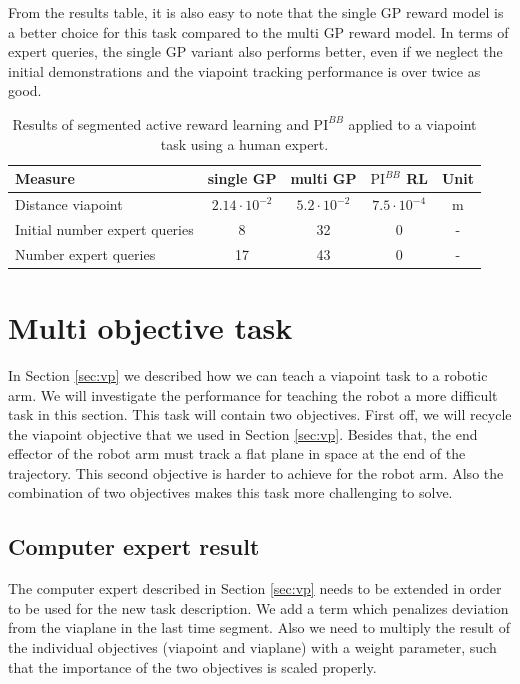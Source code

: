 \documentclass[mscThesis.tex]{subfiles}
\begin{document}
From the results table, it is also easy to note that the single GP reward model is a better choice for this task compared to the multi GP reward model. In terms of expert queries, the single GP variant also performs better, even if we neglect the initial demonstrations and the viapoint tracking performance is over twice as good.

\begin{table}[!htb]
    \centering
    \caption{Results of segmented active reward learning and $\text{PI}^{BB}$ applied to a viapoint task using a human expert.}
    \label{tab:vp-com-man}
    \begin{tabular}{|p{6cm}|c|c|c|c|}
        \hline
        Measure & single GP & multi GP & $\text{PI}^{BB}$ RL & Unit \\ \hline \hline
        Distance viapoint & $2.14 \cdot 10^{-2}$ & $5.2 \cdot 10^{-2}$ & $7.5 \cdot 10^{-4}$ & \si{m}  \\ \hline
        Initial number expert queries & 8 & 32 & 0 & - \\ \hline
        Number expert queries & 17 & 43 & 0 &  - \\ \hline
    \end{tabular}
\end{table}


\section{Multi objective task}
\label{sec:ad}

In Section \ref{sec:vp} we described how we can teach a viapoint task to a robotic arm. We will investigate the performance for teaching the robot a more difficult task in this section. This task will contain two objectives. First off, we will recycle the viapoint objective that we used in Section \ref{sec:vp}. Besides that, the end effector of the robot arm must track a flat plane in space at the end of the trajectory. This second objective is harder to achieve for the robot arm. Also the combination of two objectives makes this task more challenging to solve.

\subsection{Computer expert result}
\label{sec:com-ad}
The computer expert described in Section \ref{sec:vp} needs to be extended in order to be used for the new task description. We add a term which penalizes deviation from the viaplane in the last time segment. Also we need to multiply the result of the individual objectives (viapoint and viaplane) with a weight parameter, such that the importance of the two objectives is scaled properly. 
\end{document}
